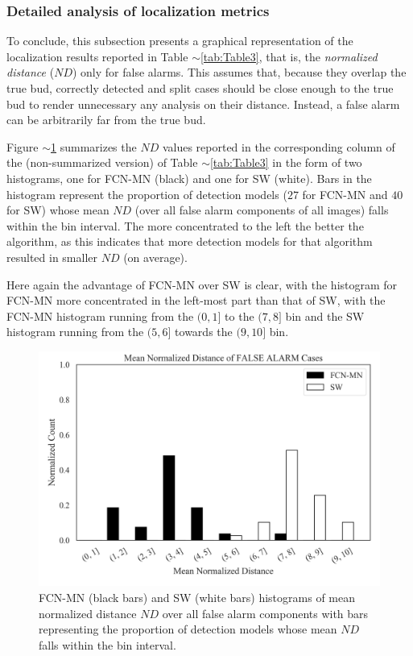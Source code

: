 \documentclass[a4paper,authoryear,review]{elsarticle}
\begin{document}
	\subsubsection{Detailed analysis of localization metrics}
	
	To conclude, this subsection presents a graphical representation of the localization results reported in Table $\sim$\ref{tab:Table3}, that is,  the \emph{normalized distance} ($ND$) only for false alarms. This assumes that, because they overlap the true bud, correctly detected and split cases should be close enough to the true bud to render unnecessary any analysis on their distance. Instead, a false alarm can be arbitrarily far from the true bud. 
	
	Figure $\sim$\ref{fig:Figure7} summarizes the $ND$ values reported in the corresponding column of the (non-summarized version) of Table $\sim$\ref{tab:Table3} in the form of two histograms, one for FCN-MN (black) and one for SW (white).  Bars in the histogram represent the proportion of detection models ($27$ for FCN-MN and $40$ for SW) whose mean $ND$ (over all false alarm components of all images) falls within the bin interval. The more concentrated to the left the better the algorithm, as this indicates that more detection models for that algorithm resulted in smaller $ND$ (on average).
	
	Here again the advantage of FCN-MN over SW is clear, with the histogram for FCN-MN more concentrated in the left-most part than that of SW, with the FCN-MN histogram running from the $(0,1]$ to the $(7,8]$ bin and the SW histogram running from the $(5,6]$ towards the $(9,10]$ bin. 
	
	\begin{figure}%
		\centering
		\includegraphics[width=\textwidth]{figures/Figure7.png}%
		\caption{
			FCN-MN (black bars) and SW (white bars) histograms of mean normalized distance $ND$ over all false alarm components with bars representing the proportion of detection models whose mean $ND$ falls within the bin interval.
		}
		\label{fig:Figure7}
	\end{figure}
	
\end{document}
